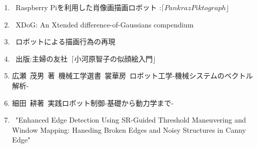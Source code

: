 \documentclass[a4j]{jarticle}			%
\begin{document}
\begin{multicols}{2}
\begin{enumerate}
\item {}\rbrack \ Raspberry Piを利用した肖像画描画ロボット :$ \lceil Pankraz Piktograph \rfloor$ 
\item {}\rbrack \ XDoG: An Xtended difference-of-Gaussians compendium
\item {}\rbrack \ ロボットによる描画行為の再現
\item {}\rbrack \ 出版:主婦の友社\ $\lceil \text{小河原智子の似顔絵入門} \rfloor$
\item 広瀬\ 茂男\ 著\ 機械工学選書\ 裳華房\ ロボット工学-機械システムのベクトル解析-
\item 細田\ 耕著\ 実践ロボット制御-基礎から動力学まで-
\item \ "Enhanced Edge Detection Using SR-Guided Threshold Maneuvering and Window Mapping: Haneding Broken Edges and Noisy Structures in Canny Edge"
\end{enumerate}

\end{multicols}
\end{document}
